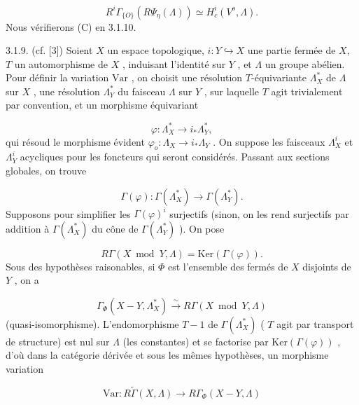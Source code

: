 
\begin{equation}\tag{3.1.8.6}
 R^i\Gamma_{\{O\}}(R\Psi_\eta(\Lambda)) \simeq H^i_c(V^o, \Lambda) .
\end{equation}
Nous vérifierons (C) en 3.1.10.

3.1.9. (cf. [3]) Soient $X$ un espace topologique, $i : Y \hookrightarrow X$ une partie fermée de $X$, $T$ un automorphisme de $X$ , induisant l'identité sur $Y$ , et $\Lambda$ un groupe abélien. Pour définir la variation $\mathrm{Var}$ , on choisit une résolution $T$-équivariante $\Lambda^*_X$ de $\Lambda$ sur $X$ , une résolution $\Lambda^*_Y$ du faisceau $\Lambda$ sur $Y$ , sur laquelle $T$ agit trivialement par convention, et un morphisme équivariant

\begin{equation*}
\varphi : \Lambda^*_X \longrightarrow i_*\Lambda^*_Y ,
\end{equation*}
qui résoud le morphisme évident $\varphi_o : \Lambda_X \longrightarrow i_* \Lambda_Y$ . On suppose les faisceaux $\Lambda^i_X$ et $\Lambda^i_Y$ acycliques pour les foncteurs qui seront considérés. Passant aux sections globales, on trouve

\begin{equation*}
\Gamma(\varphi) : \Gamma(\Lambda^*_X) \longrightarrow \Gamma(\Lambda^*_Y) .
\end{equation*}
Supposons pour simplifier les $\Gamma(\varphi)^i$ surjectifs (sinon, on les rend surjectifs par addition à $\Gamma(\Lambda^*_X)$ du cône de $\Gamma(\Lambda^*_Y)$ ). On pose

\begin{equation*}
R\Gamma (X \bmod Y, \Lambda) = \mathrm{Ker}(\Gamma (\varphi)) .
\end{equation*}
Sous des hypothèses raisonables, si $\Phi$ est l'ensemble des fermés de $X$ disjoints de $Y$ , on a

\begin{equation*}
\Gamma_\Phi(X-Y, \Lambda^*_X) \overset{\sim}{\longrightarrow} R\Gamma (X \bmod Y, \Lambda)
\end{equation*}
(quasi-isomorphisme). L'endomorphisme $T-1$ de $\Gamma(\Lambda^*_X)$ ( $T$ agit par transport de structure) est nul sur $\Lambda$ (les constantes) et se factorise par $\mathrm{Ker}(\Gamma (\varphi))$ , d'où dans la catégorie dérivée et sous les mêmes hypothèses, un morphisme variation

\begin{equation*}
\mathrm{Var} : R\widetilde{\Gamma} (X, \Lambda) \longrightarrow R\Gamma_\Phi (X-Y, \Lambda) 
\end{equation*}

